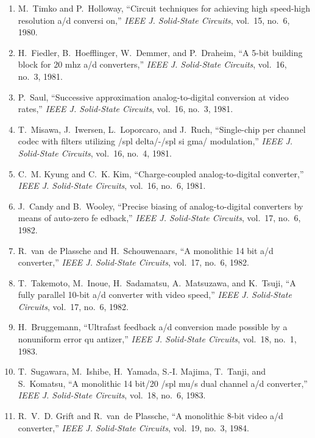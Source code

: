 \begin{enumerate}
\item
M.~Timko and P.~Holloway, ``Circuit techniques for achieving high speed-high
  resolution a/d conversi on,'' \emph{{IEEE} J. Solid-State Circuits}, vol.~15,
  no.~6, 1980.

\item
H.~Fiedler, B.~Hoefflinger, W.~Demmer, and P.~Draheim, ``A 5-bit building block
  for 20 mhz a/d converters,'' \emph{{IEEE} J. Solid-State Circuits}, vol.~16,
  no.~3, 1981.

\item
P.~Saul, ``Successive approximation analog-to-digital conversion at video
  rates,'' \emph{{IEEE} J. Solid-State Circuits}, vol.~16, no.~3, 1981.

\item
T.~Misawa, J.~Iwersen, L.~Loporcaro, and J.~Ruch, ``Single-chip per channel
  codec with filters utilizing /spl delta/-/spl si gma/ modulation,''
  \emph{{IEEE} J. Solid-State Circuits}, vol.~16, no.~4, 1981.

\item
C.~M. Kyung and C.~K. Kim, ``Charge-coupled analog-to-digital converter,''
  \emph{{IEEE} J. Solid-State Circuits}, vol.~16, no.~6, 1981.

\item
J.~Candy and B.~Wooley, ``Precise biasing of analog-to-digital converters by
  means of auto-zero fe edback,'' \emph{{IEEE} J. Solid-State Circuits},
  vol.~17, no.~6, 1982.

\item
R.~van~de Plassche and H.~Schouwenaars, ``A monolithic 14 bit a/d converter,''
  \emph{{IEEE} J. Solid-State Circuits}, vol.~17, no.~6, 1982.

\item
T.~Takemoto, M.~Inoue, H.~Sadamatsu, A.~Matsuzawa, and K.~Tsuji, ``A fully
  parallel 10-bit a/d converter with video speed,'' \emph{{IEEE} J. Solid-State
  Circuits}, vol.~17, no.~6, 1982.

\item
H.~Bruggemann, ``Ultrafast feedback a/d conversion made possible by a
  nonuniform error qu antizer,'' \emph{{IEEE} J. Solid-State Circuits},
  vol.~18, no.~1, 1983.

\item
T.~Sugawara, M.~Ishibe, H.~Yamada, S.-I. Majima, T.~Tanji, and S.~Komatsu, ``A
  monolithic 14 bit/20 /spl mu/s dual channel a/d converter,'' \emph{{IEEE} J.
  Solid-State Circuits}, vol.~18, no.~6, 1983.

\item
R.~V.~D. Grift and R.~van~de Plassche, ``A monolithic 8-bit video a/d
  converter,'' \emph{{IEEE} J. Solid-State Circuits}, vol.~19, no.~3, 1984.


\end{enumerate}
